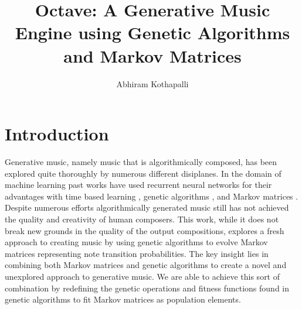 \documentclass{article}
\title{Octave: A Generative Music Engine using Genetic Algorithms and Markov Matrices}
\author{Abhiram Kothapalli}
\date{}
\begin{document}
\maketitle

\begin{abstract}

\end{abstract}

\section{Introduction}

Generative music, namely music that is algorithmically composed, has been explored quite thoroughly by numerous different disiplanes. In the domain of machine learning past works have used recurrent neural networks for their advantages with time based learning \cite{akten9realtime, 938515, DBLP:journals/corr/Graves13}, genetic algorithms \cite{eigenfeldt2015generative, miranda2001composing}, and Markov matrices \cite{fernandez2013ai}. Despite numerous efforts algorithmically generated music still has not achieved the quality and creativity of human composers. This work, while it does not break new grounds in the quality of the output compositions, explores a fresh approach to creating music by using genetic algorithms to evolve Markov matrices representing note transition probabilities. The key insight lies in combining both Markov matrices and genetic algorithms to create a novel and unexplored approach to generative music. We are able to achieve this sort of combination by redefining the genetic operations and fitness functions found in genetic algorithms to fit Markov matrices as population elements.
\end{document}
